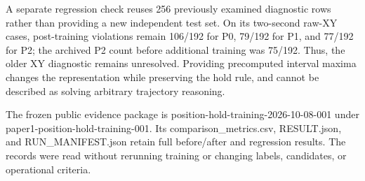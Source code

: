 \documentclass[11pt,a4paper]{article}
\begin{document}
A separate regression check reuses 256 previously examined diagnostic rows rather than providing a new independent test set. On its two-second raw-XY cases, post-training violations remain 106/192 for P0, 79/192 for P1, and 77/192 for P2; the archived P2 count before additional training was 75/192. Thus, the older XY diagnostic remains unresolved. Providing precomputed interval maxima changes the representation while preserving the hold rule, and cannot be described as solving arbitrary trajectory reasoning.\par

The frozen public evidence package is position-hold-training-2026-10-08-001 under paper1-position-hold-training-001. Its comparison\_metrics.csv, RESULT.json, and RUN\_MANIFEST.json retain full before/after and regression results. The records were read without rerunning training or changing labels, candidates, or operational criteria.\par
\end{document}
